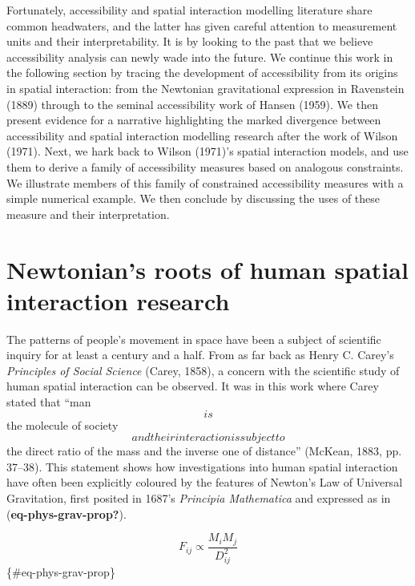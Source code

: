 \documentclass[
11pt, %
oneside, %
english, %
singlespacing, %
]{macthesis} %
\begin{document}
Fortunately, accessibility and spatial interaction modelling literature share common headwaters, and the latter has given careful attention to measurement units and their interpretability. It is by looking to the past that we believe accessibility analysis can newly wade into the future. We continue this work in the following section by tracing the development of accessibility from its origins in spatial interaction: from the Newtonian gravitational expression in Ravenstein (1889) through to the seminal accessibility work of Hansen (1959). We then present evidence for a narrative highlighting the marked divergence between accessibility and spatial interaction modelling research after the work of Wilson (1971). Next, we hark back to Wilson (1971)'s spatial interaction models, and use them to derive a family of accessibility measures based on analogous constraints. We illustrate members of this family of constrained accessibility measures with a simple numerical example. We then conclude by discussing the uses of these measure and their interpretation.

\section{Newtonian's roots of human spatial interaction research}\label{newtonians-roots-of-human-spatial-interaction-research}

The patterns of people's movement in space have been a subject of scientific inquiry for at least a century and a half. From as far back as Henry C. Carey's \emph{Principles of Social Science} (Carey, 1858), a concern with the scientific study of human spatial interaction can be observed. It was in this work where Carey stated that ``man \[is\] the molecule of society \[and their interaction is subject to\] the direct ratio of the mass and the inverse one of distance'' (McKean, 1883, pp. 37--38). This statement shows how investigations into human spatial interaction have often been explicitly coloured by the features of Newton's Law of Universal Gravitation, first posited in 1687's \emph{Principia Mathematica} and expressed as in (\textbf{eq-phys-grav-prop?}).

\[
F_{ij} \propto \frac{M_i M_j} {D_{ij}^{2}}
\] \{\#eq-phys-grav-prop\}
\end{document}
